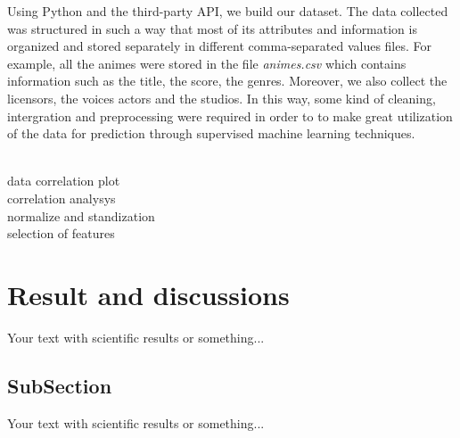 \documentclass[final]{beamer}
\begin{document}
\begin{frame}[t]
\begin{multicols}{3}
Using Python and the third-party API, we build our dataset. The data collected was structured in such a way that most of its attributes and
information is organized and stored separately in different comma-separated values files. For example, all the animes were stored in the file
\textit{animes.csv} which contains information such as the title, the score, the genres. Moreover, we also collect the licensors, the voices
actors and the studios.  In this way, some kind of cleaning, intergration and preprocessing were required in order to to make great utilization
of the data for prediction through supervised machine learning techniques.

\\ data correlation plot
\\ correlation analysys
\\ normalize and standization
\\ selection of features

\section{Result and discussions}
Your text with scientific results or something...



\subsection{SubSection}

Your text with scientific results or something...



\end{multicols}
\end{frame}
\end{document}
